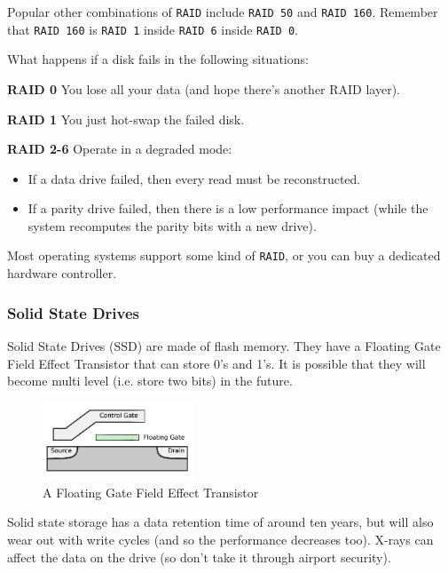 Popular other combinations of \texttt{RAID} include \texttt{RAID 50} and
\texttt{RAID 160}. Remember that \texttt{RAID 160} is \texttt{RAID 1} inside
\texttt{RAID 6} inside \texttt{RAID 0}.

What happens if a disk fails in the following situations:

\begin{description}
  \item \textbf{RAID 0} You lose all your data (and hope there's another RAID
    layer).
  \item \textbf{RAID 1} You just hot-swap the failed disk.
  \item \textbf{RAID 2-6} Operate in a degraded mode:
    \begin{itemize}
      \item If a data drive failed, then every read must be reconstructed.
      \item If a parity drive failed, then there is a low performance impact
        (while the system recomputes the parity bits with a new drive).
    \end{itemize}
\end{description}

Most operating systems support some kind of \texttt{RAID}, or you can buy a
dedicated hardware controller.

\subsubsection{Solid State Drives}

Solid State Drives (SSD) are made of flash memory. They have a Floating Gate
Field Effect Transistor that can store 0's and 1's. It is possible that they
will become multi level (i.e. store two bits) in the future.

\begin{figure}[H]
  \centering
  \includegraphics[width=0.4\textwidth]{images/fgfet}
  \caption{A Floating Gate Field Effect Transistor}
  \label{fgfet}
\end{figure}

Solid state storage has a data retention time of around ten years, but will also
wear out with write cycles (and so the performance decreases too). X-rays can
affect the data on the drive (so don't take it through airport security).

